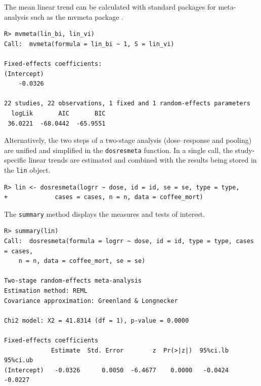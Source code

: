 \documentclass[11pt,a4paper,twoside,openany]{book}\usepackage{knitr}
\newcommand{\pkg}[1]{{\fontseries{b}\selectfont #1}}
\begin{document}
{{\noindent The mean linear trend can be calculated with standard packages for meta-analysis such as the \pkg{mvmeta} package \citep{gasparrini2012multivariate}.
\begin{knitrout}\footnotesize
{}\color{fgcolor}\begin{kframe}
\begin{verbatim}
R> mvmeta(lin_bi, lin_vi)
Call:  mvmeta(formula = lin_bi ~ 1, S = lin_vi)

Fixed-effects coefficients:
(Intercept)  
    -0.0326  

22 studies, 22 observations, 1 fixed and 1 random-effects parameters
  logLik       AIC       BIC  
 36.0221  -68.0442  -65.9551  
\end{verbatim}
\end{kframe}
\end{knitrout}

\noindent Alternatively, the two steps of a two-stage analysis (dose--response and pooling) are unified and simplified in the \texttt{dosresmeta} function. In a single call, the study-specific linear trends are estimated and combined with the results being stored in the \texttt{lin} object. 
\begin{knitrout}\footnotesize
{}\color{fgcolor}\begin{kframe}
\begin{verbatim}
R> lin <- dosresmeta(logrr ~ dose, id = id, se = se, type = type,
+             cases = cases, n = n, data = coffee_mort)
\end{verbatim}
\end{kframe}
\end{knitrout}

\noindent The \texttt{summary} method displays the measures and tests of interest.
\begin{knitrout}\footnotesize
{}\color{fgcolor}\begin{kframe}
\begin{verbatim}
R> summary(lin)
Call:  dosresmeta(formula = logrr ~ dose, id = id, type = type, cases = cases, 
    n = n, data = coffee_mort, se = se)

Two-stage random-effects meta-analysis
Estimation method: REML
Covariance approximation: Greenland & Longnecker

Chi2 model: X2 = 41.8314 (df = 1), p-value = 0.0000

Fixed-effects coefficients
             Estimate  Std. Error        z  Pr(>|z|)  95%ci.lb  95%ci.ub
(Intercept)   -0.0326      0.0050  -6.4677    0.0000   -0.0424   -0.0227



\end{verbatim}
\end{kframe}
\end{knitrout}}}
\end{document}
